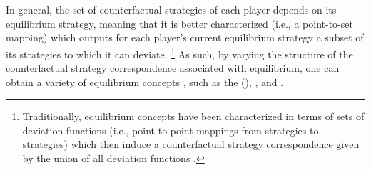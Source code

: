 In general, the set of counterfactual strategies of each player depends on its equilibrium strategy, meaning that it is better characterized  (i.e., a point-to-set mapping) which outputs for each player's current equilibrium strategy a subset of its strategies to which it can deviate.%
\footnote{Traditionally, equilibrium concepts have been characterized in terms of sets of deviation functions (i.e., point-to-point mappings from strategies to strategies) which then induce a counterfactual strategy correspondence given by the union of all deviation functions \citep{greenwald2003general, gordon2008no}.} 
As such, by varying the structure of the counterfactual strategy correspondence associated with equilibrium, one can obtain a variety of equilibrium concepts \citep{greenwald2003general}, such as the  (\citeyear{nash1950existence}), , and  \citep{aumann1974subjectivity}.
\fi


